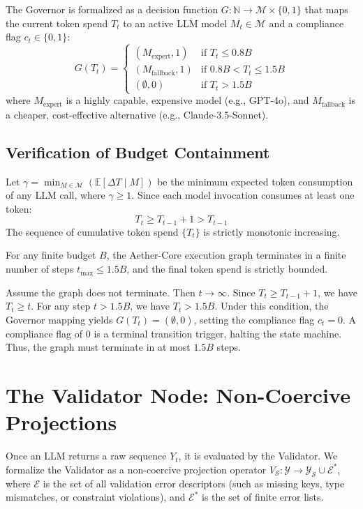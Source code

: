 \documentclass[10pt,journal,compsoc]{IEEEtran}
\begin{document}
The Governor is formalized as a decision function $G: \mathbb{N} \to \mathcal{M} \times \{0, 1\}$ that maps the current token spend $T_t$ to an active LLM model $M_t \in \mathcal{M}$ and a compliance flag $c_t \in \{0, 1\}$:
\[ G(T_t) = \begin{cases}
(M_{\text{expert}}, 1) & \text{if } T_t \le 0.8 B \\
(M_{\text{fallback}}, 1) & \text{if } 0.8 B < T_t \le 1.5 B \\
(\emptyset, 0) & \text{if } T_t > 1.5 B
\end{cases} \]
where $M_{\text{expert}}$ is a highly capable, expensive model (e.g., GPT-4o), and $M_{\text{fallback}}$ is a cheaper, cost-effective alternative (e.g., Claude-3.5-Sonnet).

\subsection{Verification of Budget Containment}
Let $\gamma = \min_{M \in \mathcal{M}} (\mathbb{E}[\Delta T \mid M])$ be the minimum expected token consumption of any LLM call, where $\gamma \ge 1$. Since each model invocation consumes at least one token:
\[ T_t \ge T_{t-1} + 1 > T_{t-1} \]
The sequence of cumulative token spend $\{T_t\}$ is strictly monotonic increasing. 
\begin{theorem}
For any finite budget $B$, the Aether-Core execution graph terminates in a finite number of steps $t_{\text{max}} \le 1.5 B$, and the final token spend is strictly bounded.
\end{theorem}
\begin{IEEEproof}
Assume the graph does not terminate. Then $t \to \infty$. Since $T_t \ge T_{t-1} + 1$, we have $T_t \ge t$. For any step $t > 1.5 B$, we have $T_t > 1.5 B$. Under this condition, the Governor mapping yields $G(T_t) = (\emptyset, 0)$, setting the compliance flag $c_t = 0$. A compliance flag of $0$ is a terminal transition trigger, halting the state machine. Thus, the graph must terminate in at most $1.5 B$ steps.
\end{IEEEproof}

\section{The Validator Node: Non-Coercive Projections}
Once an LLM returns a raw sequence $Y_t$, it is evaluated by the Validator. We formalize the Validator as a non-coercive projection operator $V_{\mathcal{S}}: \mathcal{Y} \to \mathcal{Y}_{\mathcal{S}} \cup \mathcal{E}^*$, where $\mathcal{E}$ is the set of all validation error descriptors (such as missing keys, type mismatches, or constraint violations), and $\mathcal{E}^*$ is the set of finite error lists.
\end{document}
